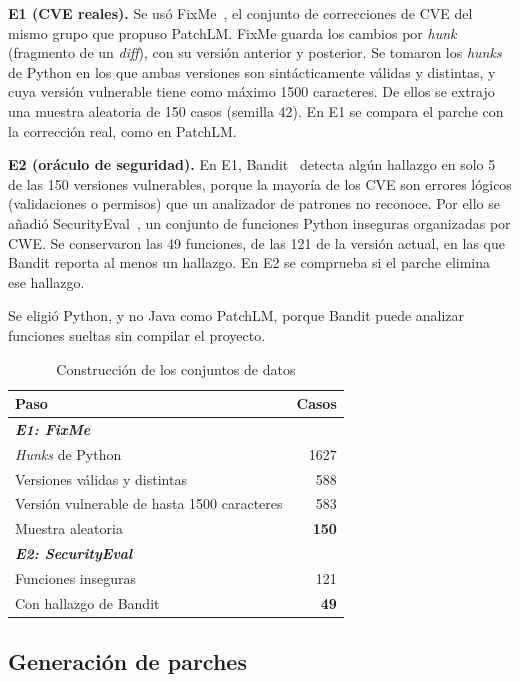 \documentclass[conference]{IEEEtran}
\begin{document}
\textbf{E1 (CVE reales).} Se usó FixMe~\cite{bhandari2024fixme}, el conjunto de correcciones de CVE del mismo grupo que propuso PatchLM. FixMe guarda los cambios por \emph{hunk} (fragmento de un \emph{diff}), con su versión anterior y posterior. Se tomaron los \emph{hunks} de Python en los que ambas versiones son sintácticamente válidas y distintas, y cuya versión vulnerable tiene como máximo 1500 caracteres. De ellos se extrajo una muestra aleatoria de 150 casos (semilla 42). En E1 se compara el parche con la corrección real, como en PatchLM.

\textbf{E2 (oráculo de seguridad).} En E1, Bandit~\cite{pycqa2026bandit} detecta algún hallazgo en solo 5 de las 150 versiones vulnerables, porque la mayoría de los CVE son errores lógicos (validaciones o permisos) que un analizador de patrones no reconoce. Por ello se añadió SecurityEval~\cite{siddiq2022securityeval}, un conjunto de funciones Python inseguras organizadas por CWE. Se conservaron las 49 funciones, de las 121 de la versión actual, en las que Bandit reporta al menos un hallazgo. En E2 se comprueba si el parche elimina ese hallazgo.

Se eligió Python, y no Java como PatchLM, porque Bandit puede analizar funciones sueltas sin compilar el proyecto.

\begin{table}[htbp]
\caption{Construcción de los conjuntos de datos}
\begin{center}
\begin{tabular}{|l|r|}
\hline
\textbf{Paso} & \textbf{Casos} \\
\hline
\multicolumn{2}{|l|}{\textbf{\textit{E1: FixMe}}} \\
\hline
\emph{Hunks} de Python & 1627 \\
Versiones válidas y distintas & 588 \\
Versión vulnerable de hasta 1500 caracteres & 583 \\
Muestra aleatoria & \textbf{150} \\
\hline
\multicolumn{2}{|l|}{\textbf{\textit{E2: SecurityEval}}} \\
\hline
Funciones inseguras & 121 \\
Con hallazgo de Bandit & \textbf{49} \\
\hline
\end{tabular}
\label{tab:datos}
\end{center}
\end{table}

\subsection{Generación de parches}
\end{document}
